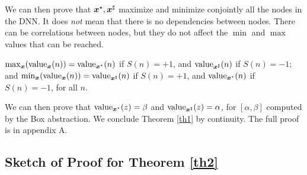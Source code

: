 We can then prove that $\boldsymbol{x}^\star,\boldsymbol{x}^\sharp$ maximize and minimize conjointly all the nodes in the DNN. It does {\em not} mean that there is no dependencies between nodes.
There can be correlations between nodes, but they do not affect the $\min$ and $\max$ values that can be reached.

\begin{proposition}
	\label{prop.sign}
	$\max_{\boldsymbol{x}} ({\textrm{value}}_{\boldsymbol{x}} (n)) = {\textrm{value}}_{\boldsymbol{x}^\star}(n)$ if $S(n)=+1$,
	and ${\textrm{value}}_{\boldsymbol{x}^\sharp}(n)$ if $S(n)=-1$; and 
	$\min_{\boldsymbol{x}} ({\textrm{value}}_{\boldsymbol{x}} (n)) = {\textrm{value}}_{\boldsymbol{x}^\sharp}(n)$ if $S(n)=+1$,
	and ${\textrm{value}}_{\boldsymbol{x}^\star}(n)$ if $S(n)=-1$, for all $n$.
\end{proposition}

We can then prove that ${\textrm{value}}_{\boldsymbol{x}^\star}(z)=\beta$ and ${\textrm{value}}_{\boldsymbol{x}^\sharp}(z)=\alpha$,
for $[\alpha, \beta]$ computed by the Box abstraction. 
We conclude Theorem \ref{th1} by continuity. The full proof is in appendix A.


\subsection{Sketch of Proof for Theorem \ref{th2}}
\label{sec.proofs2}

